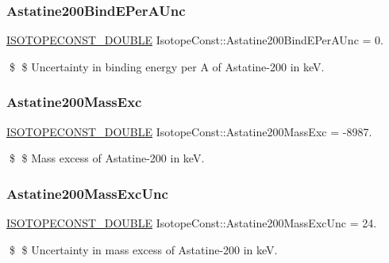\subsubsection{\texorpdfstring{Astatine200\+Bind\+E\+Per\+A\+Unc}{Astatine200BindEPerAUnc}}
{\footnotesize\ttfamily \mbox{\hyperlink{group___isotope_const-_macros_ga8f45a7272ce02c0b4c65c44636ed719a}{I\+S\+O\+T\+O\+P\+E\+C\+O\+N\+S\+T\+\_\+\+D\+O\+U\+B\+LE}} Isotope\+Const\+::\+Astatine200\+Bind\+E\+Per\+A\+Unc = 0.}

\$ \$ Uncertainty in binding energy per A of Astatine-\/200 in keV. \mbox{\label{group___isotope_const-_astatine-_at200_ga70655242348c5e0c808f79a9cff44990}} 
\subsubsection{\texorpdfstring{Astatine200\+Mass\+Exc}{Astatine200MassExc}}
{\footnotesize\ttfamily \mbox{\hyperlink{group___isotope_const-_macros_ga8f45a7272ce02c0b4c65c44636ed719a}{I\+S\+O\+T\+O\+P\+E\+C\+O\+N\+S\+T\+\_\+\+D\+O\+U\+B\+LE}} Isotope\+Const\+::\+Astatine200\+Mass\+Exc = -\/8987.}

\$ \$ Mass excess of Astatine-\/200 in keV. \mbox{\label{group___isotope_const-_astatine-_at200_ga81624c8e678e99f90e316fc8692c50a1}} 
\subsubsection{\texorpdfstring{Astatine200\+Mass\+Exc\+Unc}{Astatine200MassExcUnc}}
{\footnotesize\ttfamily \mbox{\hyperlink{group___isotope_const-_macros_ga8f45a7272ce02c0b4c65c44636ed719a}{I\+S\+O\+T\+O\+P\+E\+C\+O\+N\+S\+T\+\_\+\+D\+O\+U\+B\+LE}} Isotope\+Const\+::\+Astatine200\+Mass\+Exc\+Unc = 24.}

\$ \$ Uncertainty in mass excess of Astatine-\/200 in keV. \mbox{\label{group___isotope_const-_astatine-_at200_gaa9753fd3d3848531b3cbd2726ab3f3dc}} 
